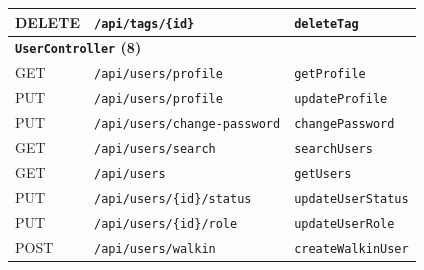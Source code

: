 {\begin{longtable}{|p{1.5cm}|p{7.3cm}|p{5.0cm}|}
\hline
DELETE & \texttt{/\allowbreak api/\allowbreak tags/\allowbreak \{id\}} & \texttt{deleteTag} \\
\hline
\multicolumn{3}{|l|}{\textbf{\texttt{UserController} (8)}} \\
\hline
GET & \texttt{/\allowbreak api/\allowbreak users/\allowbreak profile} & \texttt{getProfile} \\
\hline
PUT & \texttt{/\allowbreak api/\allowbreak users/\allowbreak profile} & \texttt{updateProfile} \\
\hline
PUT & \texttt{/\allowbreak api/\allowbreak users/\allowbreak change-password} & \texttt{changePassword} \\
\hline
GET & \texttt{/\allowbreak api/\allowbreak users/\allowbreak search} & \texttt{searchUsers} \\
\hline
GET & \texttt{/\allowbreak api/\allowbreak users} & \texttt{getUsers} \\
\hline
PUT & \texttt{/\allowbreak api/\allowbreak users/\allowbreak \{id\}/\allowbreak status} & \texttt{updateUserStatus} \\
\hline
PUT & \texttt{/\allowbreak api/\allowbreak users/\allowbreak \{id\}/\allowbreak role} & \texttt{updateUserRole} \\
\hline
POST & \texttt{/\allowbreak api/\allowbreak users/\allowbreak walkin} & \texttt{createWalkinUser} \\
\hline
\end{longtable}
}
